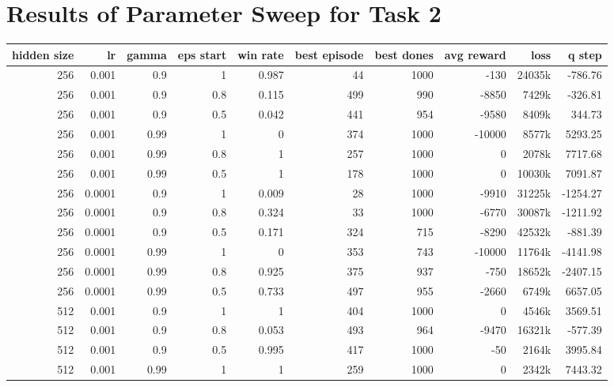 \renewcommand{\topfraction}{1}
\renewcommand{\bottomfraction}{1}
\renewcommand{\textfraction}{0}
\renewcommand{\floatpagefraction}{1}

\renewcommand{\thesection}{Appendix B}
\section{Results of Parameter Sweep for Task 2}
\label{param_sweep_result_appendix}
\begin{table}[h]
	\centering
	\scriptsize
	\begin{tabular}{r r r r | r r r r r r}
		\toprule
			hidden size & lr & gamma & eps start & win rate & best episode & best dones & avg reward & loss & q step \\
		\midrule
			256 & 0.001 & 0.9 & 1 & 0.987 & 44 & 1000 & -130 & 24035k & -786.76 \\
			256 & 0.001 & 0.9 & 0.8 & 0.115 & 499 & 990 & -8850 & 7429k & -326.81 \\
			256 & 0.001 & 0.9 & 0.5 & 0.042 & 441 & 954 & -9580 & 8409k & 344.73 \\
			256 & 0.001 & 0.99 & 1 & 0 & 374 & 1000 & -10000 & 8577k & 5293.25 \\
			256 & 0.001 & 0.99 & 0.8 & 1 & 257 & 1000 & 0 & 2078k & 7717.68 \\
			256 & 0.001 & 0.99 & 0.5 & 1 & 178 & 1000 & 0 & 10030k & 7091.87 \\
			256 & 0.0001 & 0.9 & 1 & 0.009 & 28 & 1000 & -9910 & 31225k & -1254.27 \\
			256 & 0.0001 & 0.9 & 0.8 & 0.324 & 33 & 1000 & -6770 & 30087k & -1211.92 \\
			256 & 0.0001 & 0.9 & 0.5 & 0.171 & 324 & 715 & -8290 & 42532k & -881.39 \\
			256 & 0.0001 & 0.99 & 1 & 0 & 353 & 743 & -10000 & 11764k & -4141.98 \\
			256 & 0.0001 & 0.99 & 0.8 & 0.925 & 375 & 937 & -750 & 18652k & -2407.15 \\
			256 & 0.0001 & 0.99 & 0.5 & 0.733 & 497 & 955 & -2660 & 6749k & 6657.05 \\
			512 & 0.001 & 0.9 & 1 & 1 & 404 & 1000 & 0 & 4546k & 3569.51 \\
			512 & 0.001 & 0.9 & 0.8 & 0.053 & 493 & 964 & -9470 & 16321k & -577.39 \\
			512 & 0.001 & 0.9 & 0.5 & 0.995 & 417 & 1000 & -50 & 2164k & 3995.84 \\
			512 & 0.001 & 0.99 & 1 & 1 & 259 & 1000 & 0 & 2342k & 7443.32 \\

\end{tabular}
\end{table}
